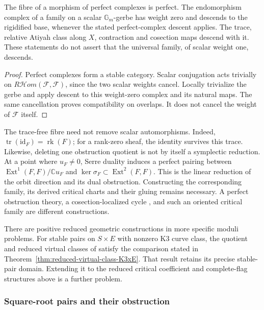 \begin{proposition}
\label{prop:rhomred-perfectness}
The fibre of a morphism of perfect complexes is perfect.  The
endomorphism complex of a family on a scalar \(\mathbb G_m\)-gerbe has
weight zero and descends to the rigidified base, whenever the stated
perfect-complex descent applies.  The trace, relative Atiyah class along \(X\), contraction and
cosection maps descend with it.  These statements do not assert that the
universal family, of scalar weight one, descends.
\end{proposition}
\begin{proof}
Perfect complexes form a stable category.  Scalar conjugation acts
trivially on \(R\mathcal Hom(\mathcal F,\mathcal F)\), since the two
scalar weights cancel.  Locally trivialize the gerbe and apply descent
to this weight-zero complex and its natural maps.  The same cancellation
proves compatibility on overlaps.  It does not cancel the weight of
\(\mathcal F\) itself.
\end{proof}

The trace-free fibre need not remove scalar automorphisms.  Indeed,
\(\operatorname{tr}(\mathrm{id}_F)=\operatorname{rk}(F)\); for a
rank-zero sheaf, the identity survives this trace.  Likewise, deleting
one obstruction quotient is not by itself a symplectic reduction.
At a point where \(u_F\ne0\), Serre duality induces a perfect
pairing between \(\operatorname{Ext}^1(F,F)/\mathbb C u_F\) and
\(\ker\sigma_F\subset\operatorname{Ext}^2(F,F)\).  This is the
linear reduction of the orbit direction and its dual obstruction.  Constructing the corresponding family,
its derived critical charts and their gluing remains necessary.  A
perfect obstruction theory, a cosection-localized cycle
\cite{KiemLi2013}, and such an oriented critical family are different
constructions.

There are positive reduced geometric constructions in more specific
moduli problems.  For stable pairs on \(S\times E\) with nonzero
K3 curve class, the quotient and reduced virtual classes of
\cite[Theorems~1--2]{OberdieckReducedPT} satisfy the comparison stated
in Theorem~\ref{thm:reduced-virtual-class-K3xE}.  That result retains
its precise stable-pair domain.  Extending it to the reduced critical
coefficient and complete-flag structures above is a further problem.

\subsubsection*{Square-root pairs and their obstruction}

